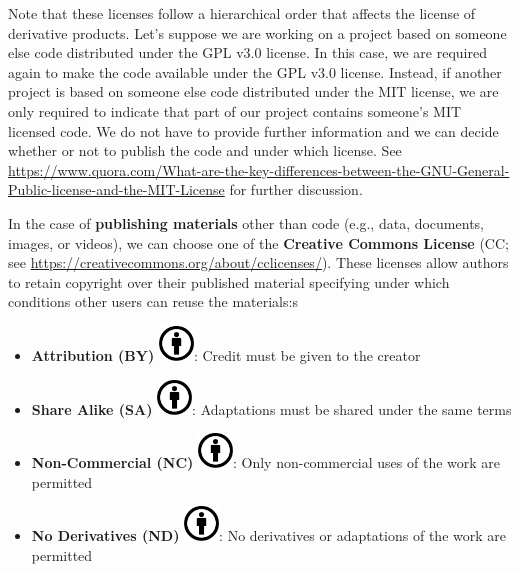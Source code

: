 \documentclass[
  11pt,
]{book}
\providecommand{\tightlist}{%
  \setlength{\itemsep}{0pt}\setlength{\parskip}{0pt}}
\begin{document}
Note that these licenses follow a hierarchical order that affects the license of derivative products. Let's suppose we are working on a project based on someone else code distributed under the GPL v3.0 license. In this case, we are required again to make the code available under the GPL v3.0 license. Instead, if another project is based on someone else code distributed under the MIT license, we are only required to indicate that part of our project contains someone's MIT licensed code. We do not have to provide further information and we can decide whether or not to publish the code and under which license. See \url{https://www.quora.com/What-are-the-key-differences-between-the-GNU-General-Public-license-and-the-MIT-License} for further discussion.

In the case of \textbf{publishing materials} other than code (e.g., data, documents, images, or videos), we can choose one of the \textbf{Creative Commons License} (CC; see \url{https://creativecommons.org/about/cclicenses/}). These licenses allow authors to retain copyright over their published material specifying under which conditions other users can reuse the materials:s

\begin{itemize}
\tightlist
\item
  \textbf{Attribution (BY)} \includegraphics[width=2.5em,height=\textheight]{images/projects/by-credits.png}: Credit must be given to the creator
\item
  \textbf{Share Alike (SA)} \includegraphics[width=2.5em,height=\textheight]{images/projects/by-credits.png}: Adaptations must be shared under the same terms
\item
  \textbf{Non-Commercial (NC)} \includegraphics[width=2.5em,height=\textheight]{images/projects/by-credits.png}: Only non-commercial uses of the work are permitted
\item
  \textbf{No Derivatives (ND)} \includegraphics[width=2.5em,height=\textheight]{images/projects/by-credits.png}: No derivatives or adaptations of the work are permitted
\end{itemize}
\end{document}
